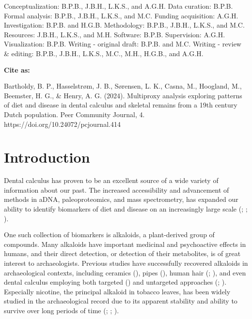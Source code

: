 \documentclass[
  b5paper,
]{book}
\begin{document}
Conceptualization: B.P.B., J.B.H., L.K.S., and A.G.H. Data curation:
B.P.B. Formal analysis: B.P.B., J.B.H., L.K.S., and M.C. Funding
acquisition: A.G.H. Investigation: B.P.B. and H.G.B. Methodology:
B.P.B., J.B.H., L.K.S., and M.C. Resources: J.B.H., L.K.S., and M.H.
Software: B.P.B. Supervision: A.G.H. Visualization: B.P.B. Writing -
original draft: B.P.B. and M.C. Writing - review \& editing: B.P.B.,
J.B.H., L.K.S., M.C., M.H., H.G.B., and A.G.H.

\textbf{Cite as:}

Bartholdy, B. P., Hasselstrøm, J. B., Sørensen, L. K., Casna, M.,
Hoogland, M., Beemster, H. G., \& Henry, A. G. (2024). Multiproxy
analysis exploring patterns of diet and disease in dental calculus and
skeletal remains from a 19th century Dutch population. Peer Community
Journal, 4. https://doi.org/10.24072/pcjournal.414

\normalsize

\newpage{}

\section{Introduction}\label{mb11CalculusPilot}

Dental calculus has proven to be an excellent source of a wide variety
of information about our past. The increased accessibility and
advancement of methods in aDNA, paleoproteomics, and mass spectrometry,
has expanded our ability to identify biomarkers of diet and disease on
an increasingly large scale
(; ;
).

One such collection of biomarkers is alkaloids, a plant-derived group of
compounds. Many alkaloids have important medicinal and psychoactive
effects in humans, and their direct detection, or detection of their
metabolites, is of great interest to archaeologists. Previous studies
have successfully recovered alkaloids in archaeological contexts,
including ceramics (), pipes (), human hair
(; ), and even dental calculus employing both targeted
() and
untargeted approaches (;
). Especially nicotine, the principal alkaloid in tobacco leaves,
has been widely studied in the archaeological record due to its apparent
stability and ability to survive over long periods of time
(;
;
).
\end{document}
